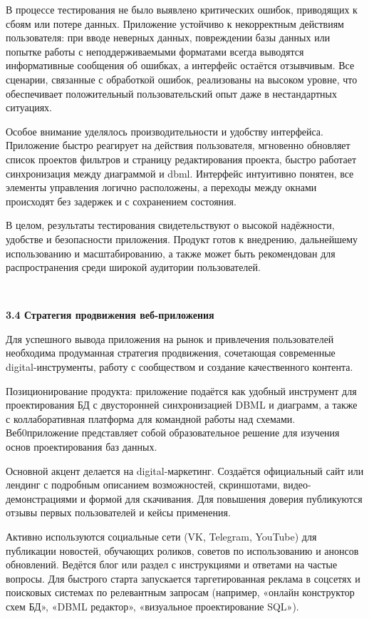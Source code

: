 В процессе тестирования не было выявлено критических ошибок,
приводящих к сбоям или потере данных. Приложение устойчиво к
некорректным действиям пользователя: при вводе неверных данных, повреждении базы данных или попытке работы с
неподдерживаемыми форматами всегда выводятся информативные
сообщения об ошибках, а интерфейс остаётся отзывчивым. Все сценарии,
связанные с обработкой ошибок, реализованы на высоком уровне, что
обеспечивает положительный пользовательский опыт даже в нестандартных
ситуациях.

Особое внимание уделялось производительности и удобству
интерфейса. Приложение быстро реагирует на действия пользователя,
мгновенно обновляет список проектов фильтров и страницу редактирования проекта, быстро работает синхронизация между диаграммой и dbml.
Интерфейс интуитивно понятен, все элементы управления логично
расположены, а переходы между окнами происходят без задержек и с
сохранением состояния.

В целом, результаты тестирования свидетельствуют о высокой
надёжности, удобстве и безопасности приложения. Продукт готов к
внедрению, дальнейшему использованию и масштабированию, а также может
быть рекомендован для распространения среди широкой аудитории
пользователей.

\

\textbf{3.4  Стратегия продвижения веб-приложения}

Для успешного вывода приложения на рынок и привлечения
пользователей необходима продуманная стратегия продвижения, сочетающая
современные digital-инструменты, работу с сообществом и создание
качественного контента.

Позиционирование продукта: приложение подаётся как
удобный инструмент для проектирования БД с двусторонней синхронизацией DBML и диаграмм, а также с коллаборативная платформа для командной работы над схемами. Веб0приложение представляет собой образовательное решение для изучения основ проектирования баз данных.

Основной акцент делается на digital-маркетинг. Создаётся официальный
сайт или лендинг с подробным описанием возможностей, скриншотами,
видео-демонстрациями и формой для скачивания. Для повышения доверия
публикуются отзывы первых пользователей и кейсы применения.

Активно используются социальные сети (VK, Telegram, YouTube) для публикации новостей, обучающих
роликов, советов по использованию и анонсов обновлений. Ведётся блог или
раздел с инструкциями и ответами на частые вопросы. Для быстрого старта
запускается таргетированная реклама в соцсетях и поисковых системах по
релевантным запросам (например, «онлайн конструктор схем БД», «DBML редактор», «визуальное проектирование SQL»).

